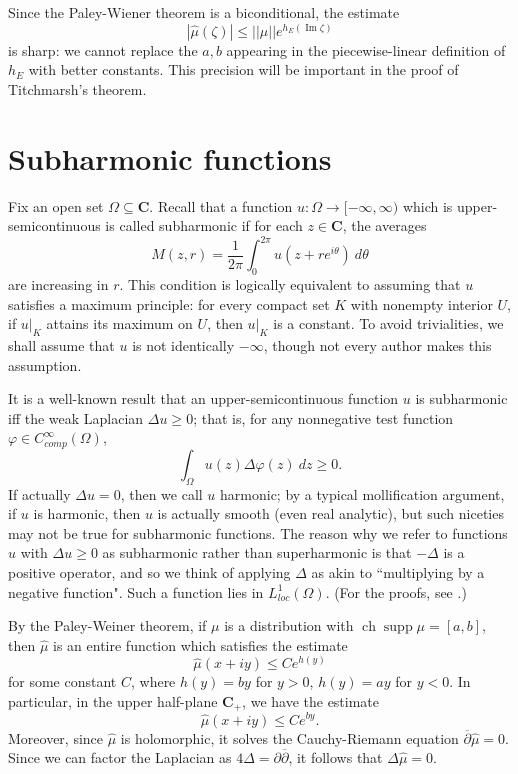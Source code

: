 \documentclass[12pt]{report}
\newcommand{\CC}{\mathbf{C}}
\DeclareMathOperator{\ch}{ch}
\DeclareMathOperator{\supp}{supp}
\newcommand{\dbar}{\overline \partial}
\renewcommand{\Im}{\operatorname{Im}}
\theoremstyle{definition}
\theoremstyle{remark}
\begin{document}
    Since the Paley-Wiener theorem is a biconditional, the estimate
    $$|\hat \mu(\zeta)| \leq ||\mu|| e^{h_E(\Im \zeta)}$$
    is sharp: we cannot replace the $a, b$ appearing in the piecewise-linear definition of $h_E$ with better constants. This precision will be important in the proof of Titchmarsh's theorem.


\section{Subharmonic functions}
Fix an open set $\Omega \subseteq \CC$. Recall that a function $u: \Omega \to [-\infty, \infty)$ which is upper-semicontinuous is called subharmonic if for each $z \in \CC$, the averages
$$M(z, r) = \frac{1}{2\pi} \int_0^{2\pi} u(z + re^{i\theta}) ~d\theta$$
are increasing in $r$. This condition is logically equivalent to assuming that $u$ satisfies a maximum principle: for every compact set $K$ with nonempty interior $U$, if $u|_K$ attains its maximum on $U$, then $u|_K$ is a constant. To avoid trivialities, we shall assume that $u$ is not identically $-\infty$, though not every author makes this assumption.

It is a well-known result that an upper-semicontinuous function $u$ is subharmonic iff the weak Laplacian $\Delta u \geq 0$; that is, for any nonnegative test function $\varphi \in C^\infty_{comp}(\Omega)$,
$$\int_\Omega u(z) \Delta \varphi(z) ~dz \geq 0.$$ If actually $\Delta u = 0$, then we call $u$ harmonic; by a typical mollification argument, if $u$ is harmonic, then $u$ is actually smooth (even real analytic), but such niceties may not be true for subharmonic functions. The reason why we refer to functions $u$ with $\Delta u \geq 0$ as subharmonic rather than superharmonic is that $-\Delta$ is a positive operator, and so we think of applying $\Delta$ as akin to ``multiplying by a negative function". Such a function lies in $L^1_{loc}(\Omega)$. (For the proofs, see \cite[Chapter 1]{hormander1973introduction}.)

By the Paley-Weiner theorem, if $\mu$ is a distribution with $\ch \supp \mu = [a, b]$, then $\hat \mu$ is an entire function which satisfies the estimate
$$\hat \mu(x + iy) \leq Ce^{h(y)}$$
for some constant $C$, where $h(y) = by$ for $y > 0$, $h(y) = ay$ for $y < 0$. In particular, in the upper half-plane $\CC_+$, we have the estimate
$$\hat \mu(x + iy) \leq Ce^{by}.$$
Moreover, since $\hat \mu$ is holomorphic, it solves the Cauchy-Riemann equation $\dbar \hat \mu = 0$. Since we can factor the Laplacian as $4\Delta = \partial \dbar$, it follows that $\Delta \hat \mu = 0$.
\end{document}
